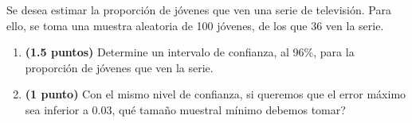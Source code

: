 
Se desea estimar la proporción de jóvenes que ven una serie de televisión. Para ello, se toma una muestra aleatoria de 100 jóvenes, de los que 36 ven la serie.
\begin{enumerate}[label=\alph*)]
\item \textbf{(1.5 puntos)} Determine un intervalo de confianza, al 96\%, para la proporción de jóvenes que ven la serie.
\item \textbf{(1 punto)} Con el mismo nivel de confianza, si queremos que el error máximo sea inferior a 0.03, \textquestiondown{}qué tamaño muestral mínimo debemos tomar?
\end{enumerate}
